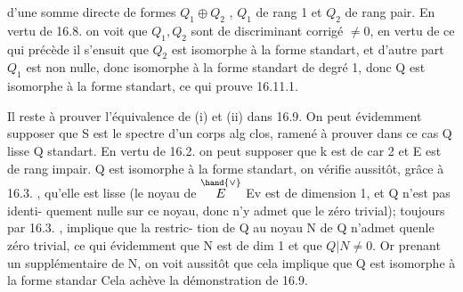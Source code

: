 
d'une somme directe de formes $Q_1 \oplus Q_2$ , $Q_1$ de rang 1 et $Q_2$ de rang pair.
En vertu de 16.8. on voit que $Q_1,Q_2$ sont de discriminant corrigé
$\neq 0$, en vertu de ce qui précède il s'ensuit que $Q_2$ est isomorphe à la
forme standart, et d'autre part $Q_1$ est non nulle, donc isomorphe à la
forme standart de degré 1, donc Q est isomorphe à la forme standart, ce
qui prouve 16.11.1.

Il reste à prouver l'équivalence de (i) et (ii) dans 16.9. On peut
évidemment supposer que S est le spectre d'un corps alg clos,  
ramené à prouver dans ce cas   Q lisse \hand{$\Longleftrightarrow$} Q standart.
En vertu de 16.2. on peut supposer que k est de car 2 et E est de rang
impair.   Q est isomorphe à la forme
standart,  on vérifie aussitôt, grâce à 16.3. , qu'elle
est lisse (le noyau de $\overset{\hand{\vee}}{E}$ \hand{$\longrightarrow$}Ev est de dimension 1, et Q n'est pas identi-%
quement nulle sur ce noyau, donc n'y admet que le zéro trivial); 
  toujours par 16.3. ,   implique que  la restric-%
tion de Q au noyau N de Q n'admet quenle zéro trivial, ce qui évidemment
  que N est de dim 1 et que $Q|N \neq 0$. Or prenant un supplémentaire
de N, on voit aussitôt que cela implique que Q est isomorphe à la forme
standar\hand{/} Cela  achève la démonstration de 16.9.

